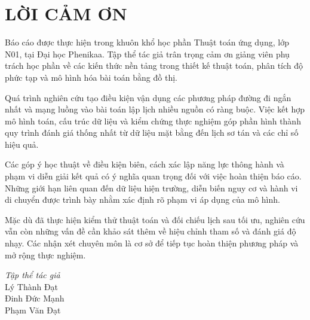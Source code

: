 \section*{LỜI CẢM ƠN}
Báo cáo được thực hiện trong khuôn khổ học phần Thuật toán ứng dụng, lớp N01, tại Đại học Phenikaa. Tập thể tác giả trân trọng cảm ơn giảng viên phụ trách học phần về các kiến thức nền tảng trong thiết kế thuật toán, phân tích độ phức tạp và mô hình hóa bài toán bằng đồ thị.

Quá trình nghiên cứu tạo điều kiện vận dụng các phương pháp đường đi ngắn nhất và mạng luồng vào bài toán lập lịch nhiều nguồn có ràng buộc. Việc kết hợp mô hình toán, cấu trúc dữ liệu và kiểm chứng thực nghiệm góp phần hình thành quy trình đánh giá thống nhất từ dữ liệu mặt bằng đến lịch sơ tán và các chỉ số hiệu quả.

Các góp ý học thuật về điều kiện biên, cách xác lập năng lực thông hành và phạm vi diễn giải kết quả có ý nghĩa quan trọng đối với việc hoàn thiện báo cáo. Những giới hạn liên quan đến dữ liệu hiện trường, diễn biến nguy cơ và hành vi di chuyển được trình bày nhằm xác định rõ phạm vi áp dụng của mô hình.

Mặc dù đã thực hiện kiểm thử thuật toán và đối chiếu lịch sau tối ưu, nghiên cứu vẫn còn những vấn đề cần khảo sát thêm về hiệu chỉnh tham số và đánh giá độ nhạy. Các nhận xét chuyên môn là cơ sở để tiếp tục hoàn thiện phương pháp và mở rộng thực nghiệm.

\begin{flushright}\textit{Tập thể tác giả}\\Lý Thành Đạt\\Đinh Đức Mạnh\\Phạm Văn Đạt\end{flushright}
